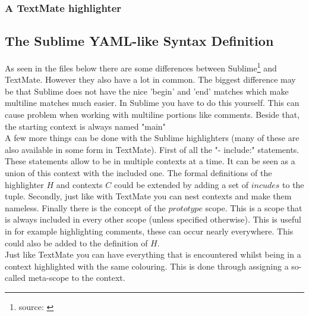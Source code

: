 	\subsubsection{A TextMate highlighter}
	
	\pagebreak
	
	\subsection{The Sublime YAML-like Syntax Definition} \label{sec:SublimeSyntax}
	As seen in the files below there are some differences between Sublime\footnote{source: \cite{website:SublimeSyntax}} and TextMate. However they also have a lot in common. The biggest difference may be that Sublime does not have the nice 'begin' and 'end' matches which make multiline matches much easier. In Sublime you have to do this yourself. This can cause problem when working with multiline portions like comments. Beside that, the starting context is always named "main"\\
	A few more things can be done with the Sublime highlighters (many of these are also available in some form in TextMate). First of all the "- include:" statements. These statements allow to be in multiple contexts at a time. It can be seen as a union of this context with the included one. The formal definitions of the highlighter $H$ and contexts $C$ could be extended by adding a set of $incudes$ to the tuple. Secondly, just like with TextMate you can nest contexts and make them nameless. Finally there is the concept of the $prototype$ scope. This is a scope that is always included in every other scope (unless specified otherwise). This is useful in for example highlighting comments, these can occur nearly everywhere. This could also be added to  the definition of $H$.\\
	Just like TextMate you can have everything that is encountered whilst being in a context highlighted with the same colouring. This is done through assigning a so-called meta-scope to the context.
	
